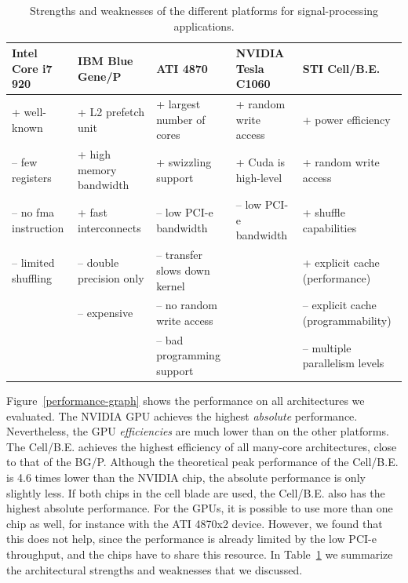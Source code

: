\documentclass{article}
\begin{document}
\begin{table}[t]
\begin{center}
{\scriptsize %
\begin{tabular}{l|l|l|l|l}
Intel Core i7 920     & IBM Blue Gene/P          & ATI 4870                      & NVIDIA Tesla C1060     & STI  Cell/B.E.                      \\
\hline
 + well-known         &  + L2 prefetch unit      &  + largest number of cores    &  + random write access &  + power efficiency                 \\
-- few registers      &  + high memory bandwidth &  + swizzling support          &  + Cuda is high-level  &  + random write access              \\
-- no fma instruction &  + fast interconnects    & -- low PCI-e bandwidth        & -- low PCI-e bandwidth &  + shuffle capabilities             \\
-- limited shuffling  & -- double precision only & -- transfer slows down kernel &                        &  + explicit cache (performance)     \\
                      & -- expensive             & -- no random write access     &                        & -- explicit cache (programmability) \\
                      &                          & -- bad programming support    &                        & -- multiple parallelism levels      \\
\end{tabular}
} %
\end{center}
\vspace{-0.5cm}
\caption{Strengths and weaknesses of the different platforms for signal-processing applications.}
\label{architecture-results-table}
\end{table}

Figure~\ref{performance-graph} shows the performance on all
architectures we evaluated. The NVIDIA GPU achieves the highest
\emph{absolute} performance. Nevertheless, the GPU \emph{efficiencies}
are much lower than on the other platforms.  The \mbox{Cell/B.E.}
achieves the highest efficiency of all many-core architectures, close
to that of the BG/P. Although the theoretical peak performance of the
\mbox{Cell/B.E.} is 4.6 times lower than the NVIDIA chip, the absolute
performance is only slightly less.  If both chips in the cell blade
are used, the \mbox{Cell/B.E.} also has the highest absolute
performance. For the GPUs, it is possible to use more than one chip as
well, for instance with the ATI 4870x2 device. However, we found that this does not help, since the
performance is already limited by the low PCI-e throughput, and the
chips have to share this resource.
In Table~\ref{architecture-results-table} we summarize the
architectural strengths and weaknesses that we discussed.  
\end{document}
